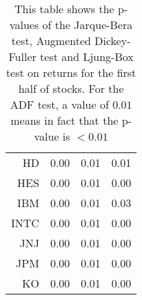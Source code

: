 \begin{table}[ht]
\begin{tabular}{rrrr}
  HD & 0.00 & 0.01 & 0.01 \\ 
  HES & 0.00 & 0.01 & 0.00 \\ 
  IBM & 0.00 & 0.01 & 0.03 \\ 
  INTC & 0.00 & 0.01 & 0.00 \\ 
  JNJ & 0.00 & 0.01 & 0.00 \\ 
  JPM & 0.00 & 0.01 & 0.00 \\ 
  KO & 0.00 & 0.01 & 0.00 \\ 
   \hline
\end{tabular}
\caption[JB test, ADF test, LB text on returns. (1)]{This table shows the p-values of the Jarque-Bera test, Augmented Dickey-Fuller test and Ljung-Box test 
                     on returns for the first half of stocks. For the ADF test, a value of $0.01$ means in fact that the p-value is $<0.01$} 
\label{Table:Rets_p_vals_1}
\end{table}
